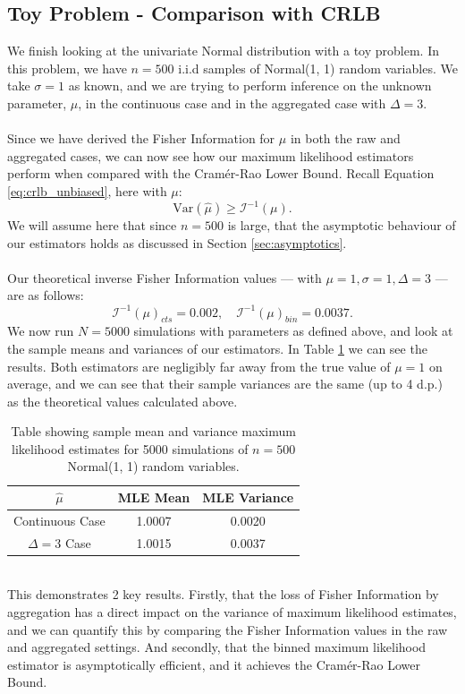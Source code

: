 \documentclass[11pt,a4,twosided,singlespacing,titlepagenumber=on,numbers=endperiod]{scrreprt}
\numberwithin{equation}{chapter} %
\theoremstyle{remark}
\begin{document}
\subsection{Toy Problem - Comparison with CRLB}
We finish looking at the univariate Normal distribution with a toy problem. In this problem, we have $n=500$ i.i.d samples of Normal(1, 1) random variables. We take $\sigma=1$ as known, and we are trying to perform inference on the unknown parameter, $\mu$, in the continuous case and in the aggregated case with $\Delta=3$. \\\\
Since we have derived the Fisher Information for $\mu$ in both the raw and aggregated cases, we can now see how our maximum likelihood estimators perform when compared with the Cram\'er-Rao Lower Bound. Recall Equation \ref{eq:crlb_unbiased}, here with $\mu$:
\begin{equation*}
	\text{Var}(\hat{\mu}) \geq \mathcal{I}^{-1}(\mu).
\end{equation*}
We will assume here that since $n=500$ is large, that the asymptotic behaviour of our estimators holds as discussed in Section \ref{sec:asymptotics}. \\\\
Our theoretical inverse Fisher Information values --- with $\mu=1, \sigma=1, \Delta=3$ --- are as follows:
\begin{equation*}
	\mathcal{I}^{-1}(\mu)_{cts} = 0.002, \quad \mathcal{I}^{-1}(\mu)_{bin} = 0.0037.
\end{equation*}
We now run $N=5000$ simulations with parameters as defined above, and look at the sample means and variances of our estimators. In Table \ref{tab:normal_mle} we can see the results. Both estimators are negligibly far away from the true value of $\mu=1$ on average, and we can see that their sample variances are the same (up to 4 d.p.) as the theoretical values calculated above.
\begin{table}[ht]
	\centering
	\begin{tabular}{|c|c|c|}
	\hline
		$\hat{\mu}$ & MLE Mean & MLE Variance \\
	\hline
		Continuous Case & 1.0007 & 0.0020 \\
	\hline
		$\Delta = 3$ Case & 1.0015 & 0.0037 \\
	\hline
	\end{tabular}
	\caption{Table showing sample mean and variance maximum likelihood estimates for 5000 simulations of $n=500$ Normal(1, 1) random variables.}
	\label{tab:normal_mle}
\end{table}\\
This demonstrates 2 key results. Firstly, that the loss of Fisher Information by aggregation has a direct impact on the variance of maximum likelihood estimates, and we can quantify this by comparing the Fisher Information values in the raw and aggregated settings. And secondly, that the binned maximum likelihood estimator is asymptotically efficient, and it achieves the Cram\'er-Rao Lower Bound.
\newpage
\end{document}
